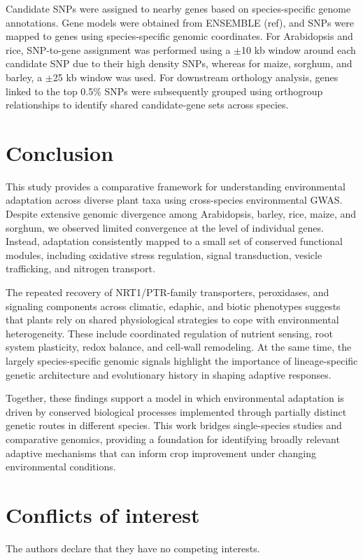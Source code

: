 \documentclass[unnumsec,webpdf,contemporary,large]{oup-authoring-template}%
\theoremstyle{thmstyleone}%
\theoremstyle{thmstyletwo}%
\theoremstyle{thmstylethree}%
\begin{document}
Candidate SNPs were assigned to nearby genes based on species-specific genome annotations. Gene models were obtained from ENSEMBLE (ref), and SNPs were mapped to genes using species-specific genomic coordinates. For Arabidopsis and rice, SNP-to-gene assignment was performed using a $\pm$10 kb window around each candidate SNP due to their high density SNPs, whereas for maize, sorghum, and barley, a $\pm$25 kb window was used. For downstream orthology analysis, genes linked to the top 0.5\% SNPs were subsequently grouped using orthogroup relationships to identify shared candidate-gene sets across species.



\section{Conclusion}

This study provides a comparative framework for understanding environmental adaptation across diverse plant taxa using cross-species environmental GWAS. Despite extensive genomic divergence among Arabidopsis, barley, rice, maize, and sorghum, we observed limited convergence at the level of individual genes. Instead, adaptation consistently mapped to a small set of conserved functional modules, including oxidative stress regulation, signal transduction, vesicle trafficking, and nitrogen transport.

The repeated recovery of NRT1/PTR-family transporters, peroxidases, and signaling components across climatic, edaphic, and biotic phenotypes suggests that plants rely on shared physiological strategies to cope with environmental heterogeneity. These include coordinated regulation of nutrient sensing, root system plasticity, redox balance, and cell-wall remodeling. At the same time, the largely species-specific genomic signals highlight the importance of lineage-specific genetic architecture and evolutionary history in shaping adaptive responses.

Together, these findings support a model in which environmental adaptation is driven by conserved biological processes implemented through partially distinct genetic routes in different species. This work bridges single-species studies and comparative genomics, providing a foundation for identifying broadly relevant adaptive mechanisms that can inform crop improvement under changing environmental conditions.

\section{Conflicts of interest}
The authors declare that they have no competing interests.
\end{document}
